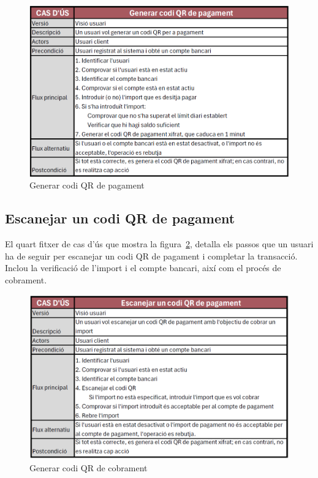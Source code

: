 \documentclass[a4paper,12pt,twoside]{ThesisStyle}
\begin{document}
\begin{figure}[h]
    \centering
    \includegraphics[width=1\textwidth]{imatges/f2.png}
    \caption{Generar codi QR de pagament}
    \label{fig:Generar codi QR de pagament}
\end{figure}

\clearpage


\subsection{Escanejar un codi QR de pagament}
\label{subsec:Escanejar un codi QR de pagament}

El quart fitxer de cas d'ús que mostra la figura~\ref{fig:Escanejar un codi QR de pagament}, detalla els passos que un usuari ha de seguir per escanejar un codi QR de pagament i completar la transacció. Inclou la verificació de l'import i el compte bancari, així com el procés de cobrament.

\begin{figure}[h]
    \centering
    \includegraphics[width=1\textwidth]{imatges/f3.png}
    \caption{Generar codi QR de cobrament}
    \label{fig:Escanejar un codi QR de pagament}
\end{figure}
\end{document}
